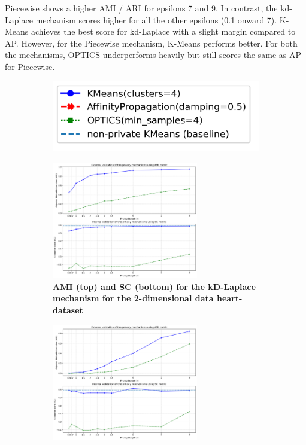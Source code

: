 Piecewise shows a higher AMI / ARI for epsilons 7 and 9. In contrast, the kd-Laplace mechanism scores higher for all the other epsilons (0.1 onward 7).
K-Means achieves the best score for kd-Laplace with a slight margin compared to AP.
However, for the Piecewise mechanism, K-Means performs better.
For both the mechanisms, OPTICS underperforms heavily but still scores the same as AP for Piecewise.
\newpage
\begin{figure}[H]
    \centering
    \begin{subfigure}{0.3\textwidth}
        \includegraphics[width=\textwidth]{Results/2d-laplace/heart-dataset/legend.png}
    \end{subfigure}
    \begin{subfigure}{1\textwidth}
        \centering
        \includegraphics[width=0.70\textwidth]{Results/kd-laplace/kd-Laplace/heart-dataset/ami-and-sc_2_dimensions.png}
        \centering
        \caption{\textbf{AMI (top) and SC (bottom) for the kD-Laplace mechanism for the 2-dimensional data heart-dataset}}
    \end{subfigure}
    \begin{subfigure}{1\textwidth}
        \centering
        \includegraphics[width=0.70\textwidth]{Results/kd-laplace/piecewise/heart-dataset/ami-and-sc_2_dimensions.png}

\end{subfigure}
\end{figure}
